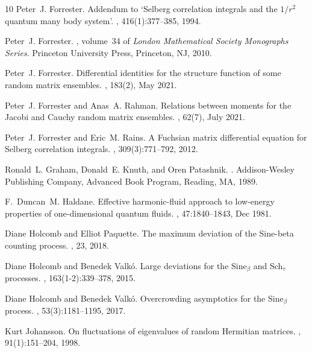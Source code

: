 \documentclass[12pt]{article}
\theoremstyle{definition} %
\theoremstyle{remark} %
\begin{document}
\begin{thebibliography}{10}
Peter~J. Forrester.
\newblock Addendum to `{S}elberg correlation integrals and the $1/r^2$ quantum
  many body system'.
, 416(1):377--385, 1994.

Peter~J. Forrester.
, volume~34 of {\em London
  Mathematical Society Monographs Series}.
\newblock Princeton University Press, Princeton, NJ, 2010.

Peter~J. Forrester.
\newblock Differential identities for the structure function of some random
  matrix ensembles.
, 183(2), May 2021.

Peter~J. Forrester and Anas~A. Rahman.
\newblock Relations between moments for the {J}acobi and {C}auchy random matrix
  ensembles.
, 62(7), July 2021.

Peter~J. Forrester and Eric~M. Rains.
\newblock A {F}uchsian matrix differential equation for {S}elberg correlation
  integrals.
, 309(3):771--792, 2012.

Ronald~L. Graham, Donald~E. Knuth, and Oren Patashnik.
.
\newblock Addison-Wesley Publishing Company, Advanced Book Program, Reading,
  MA, 1989.

F.~Duncan~M. Haldane.
\newblock Effective harmonic-fluid approach to low-energy properties of
  one-dimensional quantum fluids.
, 47:1840--1843, Dec 1981.

Diane Holcomb and Elliot Paquette.
\newblock The maximum deviation of the {S}ine-beta counting process.
, 23, 2018.

Diane Holcomb and Benedek Valk{\'o}.
\newblock Large deviations for the {Sine$_\beta$} and {Sch$_\tau$} processes.
, 163(1-2):339--378, 2015.

Diane Holcomb and Benedek Valk{\'o}.
\newblock Overcrowding asymptotics for the {S}ine$_\beta$ process.
, 53(3):1181--1195, 2017.

Kurt Johansson.
\newblock On fluctuations of eigenvalues of random {H}ermitian matrices.
, 91(1):151--204, 1998.


\end{thebibliography}
\end{document}
